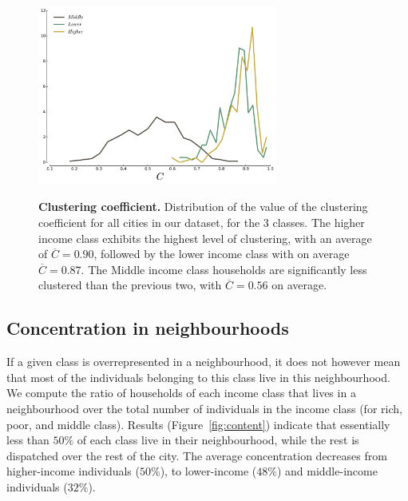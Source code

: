 \begin{figure} 
    \centering
    \includegraphics[width=0.7\textwidth]{gfx/chapter-segregation/clustering.pdf}\\
    \caption{{\bf Clustering coefficient.} Distribution of the value of the clustering coefficient for
        all cities in our dataset, for the 3 classes. The higher income class
        exhibits the highest level of clustering, with an average of
        $\overline{C} = 0.90$, followed by the lower income class with on
        average $\overline{C} = 0.87$. The Middle income class households are
        significantly less clustered than the previous two, with $\overline{C} =
        0.56$ on average.} 
        \label{fig:clustering} 
\end{figure}



\subsection{Concentration in neighbourhoods}
\label{sub:concentration_in_neighbourhoods}


If a given class is overrepresented in a neighbourhood, it does not however mean
that most of the individuals belonging to this class live in this neighbourhood.
We compute the ratio of households of each income class that lives in a
neighbourhood over the total number of individuals in the income class (for
rich, poor, and middle class).  Results (Figure~\ref{fig:content}) indicate that
essentially less than $50\%$ of each class live in their neighbourhood, while
the rest is dispatched over the rest of the city. The average concentration
decreases from higher-income individuals ($50\%$), to lower-income ($48\%$) and
middle-income individuals ($32\%$).\\


